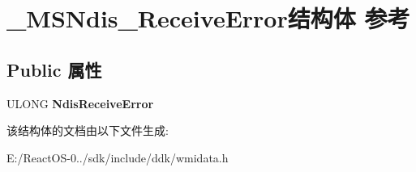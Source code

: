 \hypertarget{struct___m_s_ndis___receive_error}{}\section{\+\_\+\+M\+S\+Ndis\+\_\+\+Receive\+Error结构体 参考}
\label{struct___m_s_ndis___receive_error}
\subsection*{Public 属性}
\begin{DoxyCompactItemize}
\item 
\mbox{\label{struct___m_s_ndis___receive_error_ac4247d1df8e1cf1632962b41446ddc61}} 
U\+L\+O\+NG {\bfseries Ndis\+Receive\+Error}
\end{DoxyCompactItemize}


该结构体的文档由以下文件生成\+:\begin{DoxyCompactItemize}
\item 
E\+:/\+React\+O\+S-\/0../sdk/include/ddk/wmidata.\+h\end{DoxyCompactItemize}
